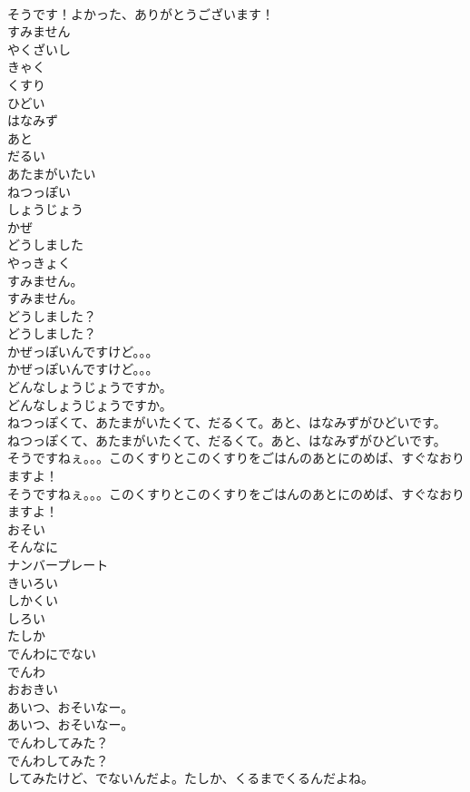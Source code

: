 \documentclass[8pt]{extreport}
\begin{document}
\begin{CJK}{UTF8}{min}
\\	そうです！よかった、ありがとうございます！
\\	すみません
\\	やくざいし
\\	きゃく
\\	くすり
\\	ひどい
\\	はなみず
\\	あと
\\	だるい
\\	あたまがいたい
\\	ねつっぽい
\\	しょうじょう
\\	かぜ
\\	どうしました
\\	やっきょく
\\	すみません。
\\	すみません。
\\	どうしました？
\\	どうしました？
\\	かぜっぽいんですけど。。。
\\	かぜっぽいんですけど。。。
\\	どんなしょうじょうですか。
\\	どんなしょうじょうですか。
\\	ねつっぽくて、あたまがいたくて、だるくて。あと、はなみずがひどいです。
\\	ねつっぽくて、あたまがいたくて、だるくて。あと、はなみずがひどいです。
\\	そうですねぇ。。。このくすりとこのくすりをごはんのあとにのめば、すぐなおりますよ！
\\	そうですねぇ。。。このくすりとこのくすりをごはんのあとにのめば、すぐなおりますよ！
\\	おそい
\\	そんなに
\\	ナンバープレート
\\	きいろい
\\	しかくい
\\	しろい
\\	たしか
\\	でんわにでない
\\	でんわ
\\	おおきい
\\	あいつ、おそいなー。
\\	あいつ、おそいなー。
\\	でんわしてみた？
\\	でんわしてみた？
\\	してみたけど、でないんだよ。たしか、くるまでくるんだよね。

\end{CJK}
\end{document}
